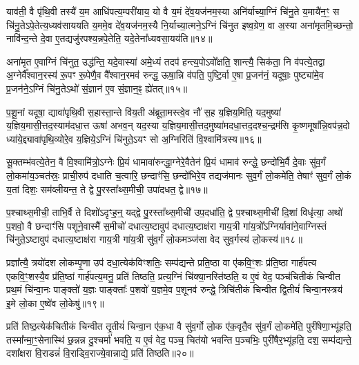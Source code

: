 {}

याव॑ती॒ वै पृ॑थि॒वी तस्यै॑ य॒म आधि॑पत्य॒म्परी॑याय॒ यो वै य॒मं दे॑व॒यज॑नम॒स्या अनि॑र्याच्या॒ग्निं चि॑नु॒ते य॒मायै॑न॒ꣳ॒ स चि॑नु॒ते\-ऽपे॒तेत्य॒ध्यव॑साययति य॒ममे॒व दे॑व॒यज॑नम॒स्यै नि॒र्याच्या॒त्मने॒\-ऽग्निं चि॑नुत इष्व॒ग्रेण॒ वा अ॒स्या अना॑मृतमि॒च्छन्तो॒ नावि॑न्द॒न्ते दे॒वा ए॒तद्यजु॑रपश्य॒न्नपे॒तेति॒ यदे॒तेना᳚ध्यवसा॒यय॑ति॥१४॥

अना॑मृत ए॒वाग्निं चि॑नुत॒ उद्ध॑न्ति॒ यदे॒वास्या॑ अमे॒ध्यं तदप॑ हन्त्य॒पो\-ऽवो᳚क्षति॒ शान्त्यै॒ सिक॑ता॒ नि व॑पत्ये॒तद्वा अ॒ग्नेर्वै᳚श्वान॒रस्य॑ रू॒पꣳ रू॒पेणै॒व वै᳚श्वान॒रमव॑ रुन्द्ध॒ ऊषा॒न्नि व॑पति॒ पुष्टि॒र्वा ए॒षा प्र॒जन॑नं॒ यदूषाः॒ पुष्ट्या॑मे॒व प्र॒जन॑ने॒\-ऽग्निं चि॑नु॒ते\-ऽथो॑ सं॒ज्ञान॑ ए॒व सं॒ज्ञान॒ꣴ॒ ह्ये॑तत्॥१५॥

प॒शू॒नां यदूषा॒ द्यावा॑पृथि॒वी स॒हास्ता॒न्ते वि॑य॒ती अ॑ब्रूता॒मस्त्वे॒व नौ॑ स॒ह य॒ज्ञिय॒मिति॒ यद॒मुष्या॑ य॒ज्ञिय॒मासी॒त्तद॒स्याम॑दधा॒त्त ऊषा॑ अभव॒न् यद॒स्या य॒ज्ञिय॒मासी॒त्तद॒मुष्या॑मदधा॒त्तद॒दश्च॒न्द्रम॑सि कृ॒ष्णमूषा᳚न्नि॒वप॑न्न॒दो ध्या॑ये॒द्द्यावा॑पृथि॒व्योरे॒व य॒ज्ञिये॒\-ऽग्निं चि॑नुते॒\-ऽयꣳ सो अ॒ग्निरिति॑ वि॒श्वामि॑त्रस्य॥१६॥

सू॒क्तम्भ॑वत्ये॒तेन॒ वै वि॒श्वामि॑त्रो॒\-ऽग्नेः प्रि॒यं धामावा॑रुन्द्धा॒ग्नेरे॒वैतेन॑ प्रि॒यं धामाव॑ रुन्द्धे॒ छन्दो॑भि॒र्वै दे॒वाः सु॑व॒र्गं लो॒कमा॑य॒ञ्चत॑स्रः॒ प्राची॒रुप॑ दधाति च॒त्वारि॒ छन्दाꣳ॑सि॒ छन्दो॑भिरे॒व तद्यज॑मानः सुव॒र्गं लो॒कमे॑ति॒ तेषाꣳ॑ सुव॒र्गं लो॒कं य॒तां दिशः॒ सम॑व्लीयन्त॒ ते द्वे पु॒रस्ता᳚थ्स॒मीची॒ उपा॑दधत॒ द्वे॥१७॥

प॒श्चाथ्स॒मीची॒ ताभि॒र्वै ते दिशो॑\-ऽदृꣳह॒न्॒ यद्द्वे पु॒रस्ता᳚थ्स॒मीची॑ उप॒दधा॑ति॒ द्वे प॒श्चाथ्स॒मीची॑ दि॒शां विधृ॑त्या॒ अथो॑ प॒शवो॒ वै छन्दाꣳ॑सि पशूने॒वास्मै॑ स॒मीचो॑ दधात्य॒ष्टावुप॑ दधात्य॒ष्टाक्ष॑रा गाय॒त्री गा॑य॒त्रो᳚\-ऽग्निर्यावा॑ने॒वाग्निस्तं चि॑नुते॒\-ऽष्टावुप॑ दधात्य॒ष्टाक्ष॑रा गाय॒त्री गा॑य॒त्री सु॑व॒र्गं लो॒कमञ्ज॑सा वेद सुव॒र्गस्य॑ लो॒कस्य॑॥१८॥

प्रज्ञा᳚त्यै॒ त्रयो॑दश लोकम्पृ॒णा उप॑ दधा॒त्येक॑विꣳशतिः॒ सम्प॑द्यन्ते प्रति॒ष्ठा वा ए॑कवि॒ꣳ॒शः प्र॑ति॒ष्ठा गार्\mbox{}ह॑पत्य एकवि॒ꣳ॒शस्यै॒व प्र॑ति॒ष्ठां गार्\mbox{}ह॑पत्य॒मनु॒ प्रति॑ तिष्ठति॒ प्रत्य॒ग्निं चि॑क्या॒नस्ति॑ष्ठति॒ य ए॒वं वेद॒ पञ्च॑चितीकं चिन्वीत प्रथ॒मं चि॑न्वा॒नः पाङ्क्तो॑ य॒ज्ञः पाङ्क्ताः᳚ प॒शवो॑ य॒ज्ञमे॒व प॒शूनव॑ रुन्द्धे॒ त्रिचि॑तीकं चिन्वीत द्वि॒तीयं॑ चिन्वा॒नस्त्रय॑ इ॒मे लो॒का ए॒ष्वे॑व लो॒केषु॑॥१९॥

प्रति॑ तिष्ठ॒त्येक॑चितीकं चिन्वीत तृ॒तीयं॑ चिन्वा॒न ए॑क॒धा वै सु॑व॒र्गो लो॒क ए॑क॒वृतै॒व सु॑व॒र्गं लो॒कमे॑ति॒ पुरी॑षेणा॒भ्यू॑हति॒ तस्मा᳚न्मा॒ꣳ॒सेनास्थि॑ छ॒न्नन्न दु॒श्चर्मा॑ भवति॒ य ए॒वं वेद॒ पञ्च॒ चित॑यो भवन्ति प॒ञ्चभिः॒ पुरी॑षैर॒भ्यू॑हति॒ दश॒ सम्प॑द्यन्ते॒ दशा᳚क्षरा वि॒राडन्नं॑ वि॒राड्वि॒राज्ये॒वान्नाद्ये॒ प्रति॑ तिष्ठति॥२०॥

